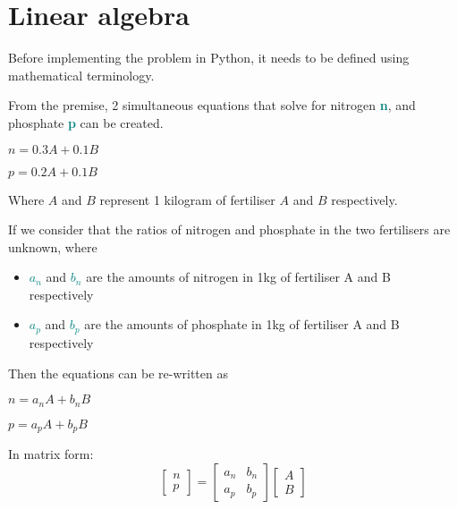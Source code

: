 \documentclass[a4paper]{article}
\begin{document}
\section{Linear algebra}
Before implementing the problem in Python, it needs to be defined using mathematical terminology.
\vspace{2mm}

\noindent
From the premise, 2 simultaneous equations that solve for nitrogen \textbf{\textcolor{teal}{n}}, and phosphate \textbf{\textcolor{teal}{p}} can be created.
\begin{center} $n=0.3A + 0.1B$ \end{center}
\begin{center} $p=0.2A + 0.1B$ \end{center}
\begin{center} Where $A$ and $B$ represent 1 kilogram of fertiliser $A$ and $B$ respectively. \end{center}

\noindent
If we consider that the ratios of nitrogen and phosphate in the two fertilisers are unknown, where
\begin{itemize}
    \item \textbf{\textcolor{teal}{$a_n$}} and \textbf{\textcolor{teal}{$b_n$}} are the amounts of nitrogen in 1kg of fertiliser A and B respectively
    \item \textbf{\textcolor{teal}{$a_p$}} and \textbf{\textcolor{teal}{$b_p$}} are the amounts of phosphate in 1kg of fertiliser A and B respectively
\end{itemize}
Then the equations can be re-written as
\begin{center} $n=a_n A + b_n B$ \end{center}
\begin{center} $p=a_p A + b_p B$ \end{center}

\noindent
In matrix form:
\begin{equation*}
    \begin{bmatrix} n \\p \end{bmatrix} =
    \begin{bmatrix} a_n & b_n \\ a_p & b_p \end{bmatrix}
    \begin{bmatrix} A \\ B \end{bmatrix}
\end{equation*}
\end{document}
